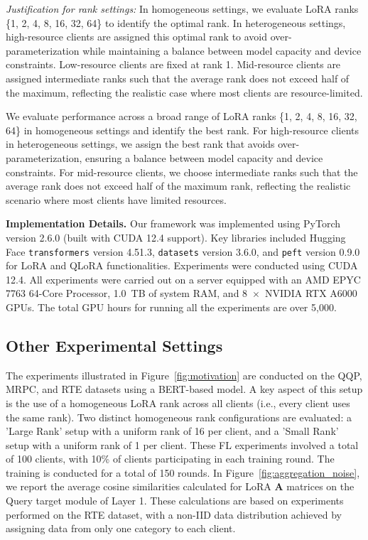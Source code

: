 \documentclass{article} %
\begin{document}
\textit{Justification for rank settings:} In homogeneous settings, we evaluate LoRA ranks \{1, 2, 4, 8, 16, 32, 64\} to identify the optimal rank. In heterogeneous settings, high-resource clients are assigned this optimal rank to avoid over-parameterization while maintaining a balance between model capacity and device constraints. Low-resource clients are fixed at rank 1. Mid-resource clients are assigned intermediate ranks such that the average rank does not exceed half of the maximum, reflecting the realistic case where most clients are resource-limited. 


We evaluate performance across a broad range of LoRA ranks \{1, 2, 4, 8, 16, 32, 64\} in homogeneous settings and identify the best rank. For high-resource clients in heterogeneous settings, we assign the best rank that avoids over-parameterization, ensuring a balance between model capacity and device constraints. For mid-resource clients, we choose intermediate ranks such that the average rank does not exceed half of the maximum rank, reflecting the realistic scenario where most clients have limited resources.



\noindent\textbf{Implementation Details.}
Our framework was implemented using PyTorch version 2.6.0 (built with CUDA 12.4 support). Key libraries included Hugging Face \texttt{transformers} version 4.51.3, \texttt{datasets} version 3.6.0, and \texttt{peft} version 0.9.0 for LoRA and QLoRA functionalities. Experiments were conducted using CUDA 12.4. All experiments were carried out on a server equipped with an AMD EPYC 7763 64-Core Processor, 1.0~TB of system RAM, and 8~$\times$~NVIDIA RTX A6000 GPUs. The total GPU hours for running all the experiments are over 5,000.


\subsection{Other Experimental Settings}\label{appendixsubsection:other_settings}


The experiments illustrated in Figure~\ref{fig:motivation} are conducted on the QQP, MRPC, and RTE datasets using a BERT-based model. A key aspect of this setup is the use of a homogeneous LoRA rank across all clients (i.e., every client uses the same rank). Two distinct homogeneous rank configurations are evaluated: a 'Large Rank' setup with a uniform rank of 16 per client, and a 'Small Rank' setup with a uniform rank of 1 per client. These FL experiments involved a total of 100 clients, with 10\% of clients participating in each training round. The training is conducted for a total of 150 rounds.
%
In Figure~\ref{fig:aggregation_noise}, we report the average cosine similarities calculated for LoRA $\mathbf{A}$ matrices on the Query target module of Layer 1. These calculations are based on experiments performed on the RTE dataset, with a non-IID data distribution achieved by assigning data from only one category to each client.
\end{document}
